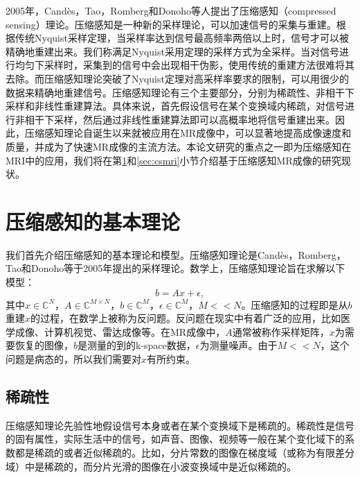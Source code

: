 2005年，Candès，Tao，Romberg\cite{candes2004near,candes2006compressive,candes2006quantitative,candes2006stable}和Donoho\cite{Donoho2006Compressed}等人提出了压缩感知（compressed sensing）理论。压缩感知是一种新的采样理论，可以加速信号的采集与重建。根据传统Nyquist采样定理\cite{Nyquist}，当采样率达到信号最高频率两倍以上时，信号才可以被精确地重建出来。我们称满足Nyquist采用定理的采样方式为全采样。当对信号进行均匀下采样时，采集到的信号中会出现相干伪影，使用传统的重建方法很难将其去除。而压缩感知理论突破了Nyquist定理对高采样率要求的限制，可以用很少的数据来精确地重建信号。压缩感知理论有三个主要部分，分别为稀疏性、非相干下采样和非线性重建算法。具体来说，首先假设信号在某个变换域内稀疏，对信号进行非相干下采样，然后通过非线性重建算法即可以高概率地将信号重建出来。因此，压缩感知理论自诞生以来就被应用在MR成像中，可以显著地提高成像速度和质量，并成为了快速MR成像的主流方法。本论文研究的重点之一即为压缩感知在MRI中的应用，我们将在第\ref{sec:cs}和\ref{sec:csmri}小节介绍基于压缩感知MR成像的研究现状。

\section{压缩感知的基本理论}
\label{sec:cs}
我们首先介绍压缩感知的基本理论和模型。压缩感知理论是Candès，Romberg，Tao\cite{candes2004near,candes2006compressive,candes2006quantitative,candes2006stable}和Donoho\cite{Donoho2006Compressed}等于2005年提出的采样理论。数学上，压缩感知理论旨在求解以下模型：
\begin{equation}
	b=Ax+\epsilon,
	\label{equ:cs}
\end{equation}
其中$x\in \mathbb{C}^N$，$A\in \mathbb{C}^{M\times N}$，$b\in \mathbb{C}^M$，$\epsilon\in \mathbb{C}^M$，$M<<N$。压缩感知的过程即是从$b$重建$x$的过程，在数学上被称为反问题。反问题在现实中有着广泛的应用，比如医学成像\cite{golbabaee2012hyperspectral,quinsac2010compressed,xu2012low,lustig2006}、计算机视觉\cite{wright2008robust}、雷达成像\cite{choi2010compressed}等。在MR成像中，$A$通常被称作采样矩阵，$x$为需要恢复的图像，$b$是测量的到的k-space数据，$\epsilon$为测量噪声。由于$M<<N$，这个问题是病态的，所以我们需要对$x$有所约束。

\subsection{稀疏性}
压缩感知理论先验性地假设信号本身或者在某个变换域下是稀疏的。稀疏性是信号的固有属性，实际生活中的信号，如声音、图像、视频等一般在某个变化域下的系数都是稀疏的或者近似稀疏的。比如，分片常数的图像在梯度域（或称为有限差分域）中是稀疏的，而分片光滑的图像在小波变换域中是近似稀疏的。

